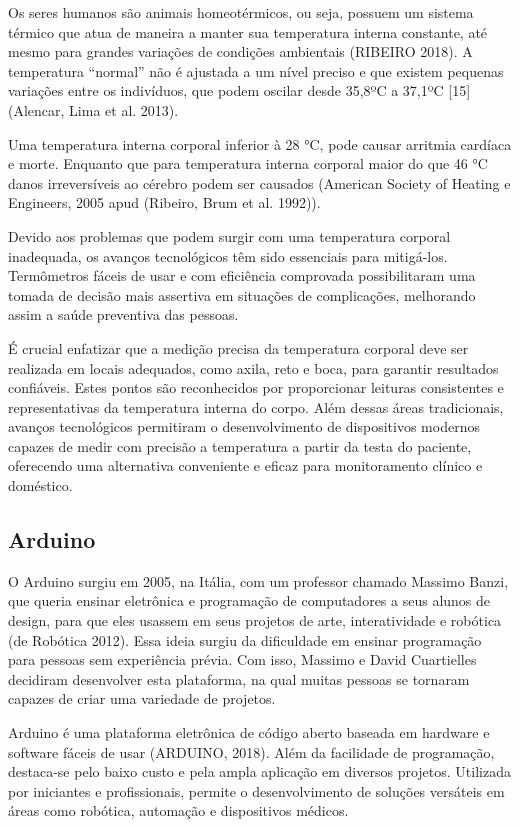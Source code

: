 Os seres humanos são animais homeotérmicos, ou seja, possuem um sistema térmico que atua de maneira a manter sua temperatura interna constante, até mesmo para grandes variações de condições ambientais (RIBEIRO 2018). A temperatura “normal” não é ajustada a um nível preciso e que existem pequenas variações entre os indivíduos, que podem oscilar desde 35,8ºC a 37,1ºC [15] (Alencar, Lima et al. 2013).

Uma temperatura interna corporal inferior à 28 °C, pode causar arritmia cardíaca e morte. Enquanto que para temperatura interna corporal maior do que 46 °C danos irreversíveis ao cérebro podem ser causados (American Society of Heating e Engineers, 2005 apud (Ribeiro, Brum et al. 1992)).

Devido aos problemas que podem surgir com uma temperatura corporal inadequada, os avanços tecnológicos têm sido essenciais para mitigá-los. Termômetros fáceis de usar e com eficiência comprovada possibilitaram uma tomada de decisão mais assertiva em situações de complicações, melhorando assim a saúde preventiva das pessoas.

É crucial enfatizar que a medição precisa da temperatura corporal deve ser realizada em locais adequados, como axila, reto e boca, para garantir resultados confiáveis. Estes pontos são reconhecidos por proporcionar leituras consistentes e representativas da temperatura interna do corpo. Além dessas áreas tradicionais, avanços tecnológicos permitiram o desenvolvimento de dispositivos modernos capazes de medir com precisão a temperatura a partir da testa do paciente, oferecendo uma alternativa conveniente e eficaz para monitoramento clínico e doméstico.

\subsection{Arduino}

O Arduino surgiu em 2005, na Itália, com um professor chamado Massimo Banzi, que queria ensinar eletrônica e programação de computadores a seus alunos de design, para que eles usassem em seus projetos de arte, interatividade e robótica (de Robótica 2012). Essa ideia surgiu da dificuldade em ensinar programação para pessoas sem experiência prévia. Com isso, Massimo e David Cuartielles decidiram desenvolver esta plataforma, na qual muitas pessoas se tornaram capazes de criar uma variedade de projetos.

Arduino é uma plataforma eletrônica de código aberto baseada em hardware e software fáceis de usar (ARDUINO, 2018). Além da facilidade de programação, destaca-se pelo baixo custo e pela ampla aplicação em diversos projetos. Utilizada por iniciantes e profissionais, permite o desenvolvimento de soluções versáteis em áreas como robótica, automação e dispositivos médicos.

